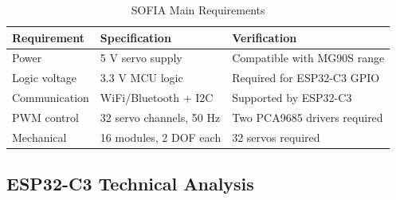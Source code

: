\documentclass[lettersize,journal]{IEEEtran}
\begin{document}
	
	\begin{table}[H]
		\centering
		\caption{SOFIA Main Requirements}
		\scriptsize
		
		\setlength{\tabcolsep}{2pt}
		\renewcommand{\arraystretch}{1.05}
		
		\begin{tabularx}{\columnwidth}
			{@{}P{2.1cm} P{2.1cm} Y@{}}
			
			\toprule
			Requirement & Specification & Verification\\
			\midrule
			
			Power &
			5 V servo supply &
			Compatible with MG90S range \\
			
			Logic voltage &
			3.3 V MCU logic &
			Required for ESP32-C3 GPIO \\
			
			Communication &
			WiFi/Bluetooth + I2C &
			Supported by ESP32-C3 \\
			
			PWM control &
			32 servo channels, 50 Hz &
			Two PCA9685 drivers required \\
			
			Mechanical &
			16 modules, 2 DOF each &
			32 servos required \\
			
			\bottomrule
			
		\end{tabularx}
	\end{table}
	
	
	\subsection{ESP32-C3 Technical Analysis}
	
\end{document}

